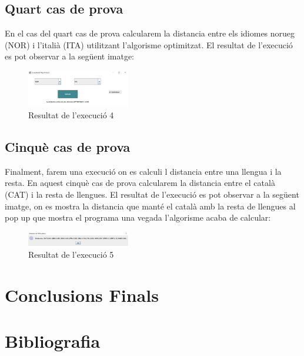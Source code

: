 \documentclass[conference]{IEEEtran}
\begin{document}
\subsection{Quart cas de prova}
En el cas del quart cas de prova calcularem la distancia entre els idiomes norueg (NOR) i l'italià (ITA) utilitzant l'algorisme optimitzat. El resultat de l'execució es pot observar a la següent imatge:
\begin{figure}[ht]
    \centering
    \includegraphics[width=0.4\textwidth]{images/execucio4.png}
    \caption{Resultat de l'execució 4}
\end{figure}
\subsection{Cinquè cas de prova}
Finalment, farem una execució on es calculi l distancia entre una llengua i la resta. En aquest cinquè cas de prova calcularem la distancia entre el català (CAT) i la resta de llengues. El resultat de l'execució es pot observar a la següent imatge, on es mostra la distancia que manté el català amb la resta de llengues al pop up que mostra el programa una vegada l'algorisme acaba de calcular:
\begin{figure}[ht]
    \centering
    \includegraphics[width=0.4\textwidth]{images/execucio5.png}
    \caption{Resultat de l'execució 5}
\end{figure}

\section{Conclusions Finals}




\section{Bibliografia}

    
\end{document}
